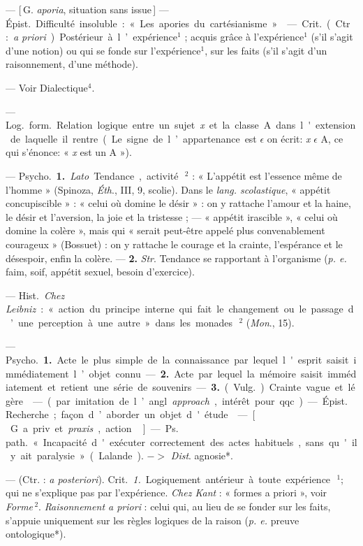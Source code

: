 \begin{itemize}[leftmargin=1cm, label=, itemsep=1pt]
{{ — [\,G. {\it aporia}, situation sans issue\,]
— \si{Épist.} Difficulté insoluble : « Les
apories du cartésianisme. »

 — \si{Crit.} (Ctr. : {\it a priori}).
Postérieur à l’expérience$^1$ ; acquis
grâce à l'expérience$^1$ (s’il s’agit d'une
notion) ou qui se fonde sur l'expérience$^1$,
sur les faits (s’il s’agit d’un
raisonnement, d’une méthode).

 — Voir Dialectique$^4$.

 — \si{Log.} \si{form.} Relation
logique entre un sujet {\it x} et la
classe A dans l'extension de laquelle
il rentre (Le signe de l’appartenance
est $\epsilon$ on écrit: {\it x} $\epsilon$ A, ce qui s’énonce:
« {\it x} est un A »).

— \si{Psycho.} {\bf 1.} {\it Lato}. Tendance,
activité\,$^2$ : « L'appétit est l'essence
même de l’homme » (Spinoza, {\it Éth}.,
III, 9, scolie). Dans le {\it lang. scolastique}, « appétit concupiscible » :
« celui où domine le désir » : on y
rattache l'amour et la haine, le désir
et l’aversion, la joie et la tristesse ; —
« appétit irascible », « celui où domine
la colère », mais qui « serait peut-être
appelé plus convenablement courageux » (Bossuet) : on y rattache le
courage et la crainte, l'espérance et
le désespoir, enfin la colère. — {\bf 2.} {\it Str}.
Tendance se rapportant à l'organisme ({\it p. e.} faim, soif, appétit sexuel,
besoin d’exercice).

 — \si{Hist.} {\it Chez Leibniz} :
« action du principe interne qui fait
le changement ou le passage d’une
perception à une autre » dans les
monades\,$^2$ ({\it Mon}., 15).

 — \si{Psycho.} {\bf 1.} Acte le
plus simple de la connaissance par
lequel l'esprit saisit immédiatement
l’objet connu. — {\bf 2.} Acte par lequel
la mémoire saisit immédiatement et
retient une série de souvenirs. —
 {\bf 3.} (\si{Vulg.}) Crainte vague et légère.

 — (par imitation de l’angl.
{\it approach}, intérêt pour qqc). —
\si{Épist.} Recherche; façon d’aborder
un objet d'étude.

 — [\,G. a priv. et {\it praxis}, action\,]
— \si{Ps. path.} « Incapacité d'exécuter
correctement des actes habituels,
sans qu'il y ait paralysie » (Lalande).
$->$ {\it Dist}. agnosie*.

 — (Ctr. : {\it a posteriori}). \si{Crit.}
{\it 1.} Logiquement antérieur à toute
expérience\,$^1$; qui ne s'explique pas
par l'expérience. {\it Chez Kant} : « formes
a priori », voir {\it Forme}\,$^2$. {\it Raisonnement a priori} : celui qui, au lieu de
se fonder sur les faits, s’appuie uniquement sur les règles logiques de la
raison ({\it p. e.} preuve ontologique*).

}}
\end{itemize}
